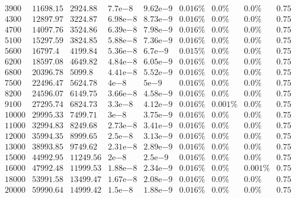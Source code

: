 \documentclass{llncs}
\newcommand{\expnumber}[2]{{#1}\mathrm{e}{#2}}
\begin{document}
\begin{table}[H]
$$\begin{array}{|c|c|c|c|c|c|c|c|c|c|}
			3900 & 11698.15 & 2924.88 & \expnumber{7.7}{-8} & \expnumber{9.62}{-9} & 0.016\% & 0.0\% & 0.0\% & 0.75 \\
			4300 & 12897.97 & 3224.87 & \expnumber{6.98}{-8} & \expnumber{8.73}{-9} & 0.016\% & 0.0\% & 0.0\% & 0.75 \\
			4700 & 14097.76 & 3524.86 & \expnumber{6.39}{-8} & \expnumber{7.98}{-9} & 0.016\% & 0.0\% & 0.0\% & 0.75 \\
			5100 & 15297.59 & 3824.85 & \expnumber{5.88}{-8} & \expnumber{7.36}{-9} & 0.016\% & 0.0\% & 0.0\% & 0.75 \\
			5600 & 16797.4 & 4199.84 & \expnumber{5.36}{-8} & \expnumber{6.7}{-9} & 0.015\% & 0.0\% & 0.0\% & 0.75 \\
			6200 & 18597.08 & 4649.82 & \expnumber{4.84}{-8} & \expnumber{6.05}{-9} & 0.016\% & 0.0\% & 0.0\% & 0.75 \\
			6800 & 20396.78 & 5099.8 & \expnumber{4.41}{-8} & \expnumber{5.52}{-9} & 0.016\% & 0.0\% & 0.0\% & 0.75 \\
			7500 & 22496.47 & 5624.78 & \expnumber{4}{-8} & \expnumber{5}{-9} & 0.016\% & 0.0\% & 0.0\% & 0.75 \\
			8200 & 24596.07 & 6149.75 & \expnumber{3.66}{-8} & \expnumber{4.58}{-9} & 0.016\% & 0.0\% & 0.0\% & 0.75 \\
			9100 & 27295.74 & 6824.73 & \expnumber{3.3}{-8} & \expnumber{4.12}{-9} & 0.016\% & 0.001\% & 0.0\% & 0.75 \\
			10000 & 29995.33 & 7499.71 & \expnumber{3}{-8} & \expnumber{3.75}{-9} & 0.016\% & 0.0\% & 0.0\% & 0.75 \\
			11000 & 32994.83 & 8249.68 & \expnumber{2.73}{-8} & \expnumber{3.41}{-9} & 0.016\% & 0.0\% & 0.0\% & 0.75 \\
			12000 & 35994.35 & 8999.65 & \expnumber{2.5}{-8} & \expnumber{3.13}{-9} & 0.016\% & 0.0\% & 0.0\% & 0.75 \\
			13000 & 38993.85 & 9749.62 & \expnumber{2.31}{-8} & \expnumber{2.89}{-9} & 0.016\% & 0.0\% & 0.0\% & 0.75 \\
			15000 & 44992.95 & 11249.56 & \expnumber{2}{-8} & \expnumber{2.5}{-9} & 0.016\% & 0.0\% & 0.0\% & 0.75 \\
			16000 & 47992.48 & 11999.53 & \expnumber{1.88}{-8} & \expnumber{2.34}{-9} & 0.016\% & 0.0\% & 0.001\% & 0.75 \\
			18000 & 53991.58 & 13499.47 & \expnumber{1.67}{-8} & \expnumber{2.08}{-9} & 0.016\% & 0.0\% & 0.0\% & 0.75 \\
			20000 & 59990.64 & 14999.42 & \expnumber{1.5}{-8} & \expnumber{1.88}{-9} & 0.016\% & 0.0\% & 0.0\% & 0.75 \\

\end{array}$$
\end{table}
\end{document}
